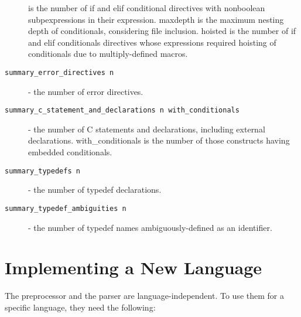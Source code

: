 \documentclass{article}
\begin{document}
\begin{description}
  is the number of if and elif conditional directives with nonboolean
  subpexpressions in their expression.  maxdepth is the maximum
  nesting depth of conditionals, considering file inclusion.  hoisted
  is the number of if and elif conditionals directives whose
  expressions required hoisting of conditionals due to
  multiply-defined macros.
\item[\texttt{summary\_error\_directives n}] - the number of error
  directives.
\item[\texttt{summary\_c\_statement\_and\_declarations n
    with\_conditionals}] - the number of C statements and
  declarations, including external declarations.  with\_conditionals
  is the number of those constructs having embedded conditionals.
\item[\texttt{summary\_typedefs n}] - the number of typedef
  declarations.
\item[\texttt{summary\_typedef\_ambiguities n}] - the number of
  typedef names ambiguously-defined as an identifier.
\end{description}


\section{Implementing a New Language}

The preprocessor and the parser are language-independent.  To use them
for a specific language, they need the following:
\end{document}
